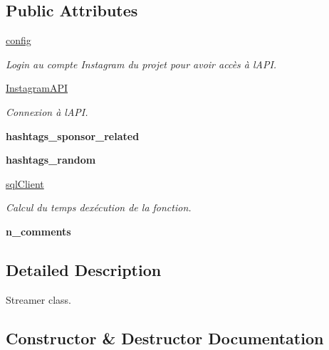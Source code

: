 \subsection*{Public Attributes}
\begin{DoxyCompactItemize}
\item 
\mbox{\hyperlink{classstreamer_1_1_streamer_a8277cc626d919a135a8c7f2b1c8d48b7}{config}}
\begin{DoxyCompactList}\small\item\em Login au compte Instagram du projet pour avoir accès à l\textquotesingle{}A\+PI. \end{DoxyCompactList}\item 
\mbox{\hyperlink{classstreamer_1_1_streamer_a9e80f10c0b27f7f88d401ce838975640}{Instagram\+A\+PI}}
\begin{DoxyCompactList}\small\item\em Connexion à l\textquotesingle{}A\+PI. \end{DoxyCompactList}\item 
\mbox{\label{classstreamer_1_1_streamer_aa7493e40973e93c4d68e2859486132f7}} 
{\bfseries hashtags\+\_\+sponsor\+\_\+related}
\item 
\mbox{\label{classstreamer_1_1_streamer_ae284273790497dd16b742451763b8c1e}} 
{\bfseries hashtags\+\_\+random}
\item 
\mbox{\hyperlink{classstreamer_1_1_streamer_ae7cbab4c93f54faa038805789506e167}{sql\+Client}}
\begin{DoxyCompactList}\small\item\em Calcul du temps d\textquotesingle{}exécution de la fonction. \end{DoxyCompactList}\item 
\mbox{\label{classstreamer_1_1_streamer_a78e223c97e44e78fe8d165488e1a1891}} 
{\bfseries n\+\_\+comments}
\end{DoxyCompactItemize}


\subsection{Detailed Description}
\begin{DoxyVerb}Streamer class.
\end{DoxyVerb}
 

\subsection{Constructor \& Destructor Documentation}
\mbox{\label{classstreamer_1_1_streamer_aae063a4ecba841acd0f6994af01d59c2}} 
